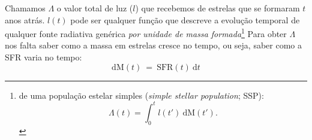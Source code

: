 Chamamos $\Lambda$ o valor total de luz ($l$) que recebemos de estrelas que se formaram $t$ anos atrás. $l(t)$ pode ser qualquer função que descreve a evolução temporal de qualquer fonte radiativa genérica \emph{por unidade de massa formada}\footnote{ de uma população estelar simples ({\em simple stellar population}; SSP):
\begin{equation}
	\Lambda(t) = \int_0^t l(t')\ \textrm{d}\textrm{M}(t').
	\label{eq:dLambda}
\end{equation}
}
\noindent Para obter $\Lambda$ nos falta saber como a massa em estrelas cresce no tempo, ou seja, saber como a SFR varia no tempo:
\begin{equation}
	\mathrm{d}\mathrm{M}(t)\ =\ \mathrm{SFR}(t)\ \mathrm{d}t
	\label{eq:dM_t}
\end{equation}

